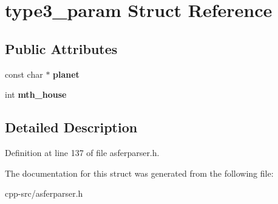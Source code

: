 \hypertarget{structtype3__param}{\section{type3\-\_\-param Struct Reference}
\label{structtype3__param}
}
\subsection*{Public Attributes}
\begin{DoxyCompactItemize}
\item 
\hypertarget{structtype3__param_a56d2c2c658ab50a4ab415f4fc7094ee0}{const char $\ast$ {\bfseries planet}}\label{structtype3__param_a56d2c2c658ab50a4ab415f4fc7094ee0}

\item 
\hypertarget{structtype3__param_aa3f096cf398cc4ecf777d217f1b06ec3}{int {\bfseries mth\-\_\-house}}\label{structtype3__param_aa3f096cf398cc4ecf777d217f1b06ec3}

\end{DoxyCompactItemize}


\subsection{Detailed Description}


Definition at line 137 of file asferparser.\-h.



The documentation for this struct was generated from the following file\-:\begin{DoxyCompactItemize}
\item 
cpp-\/src/asferparser.\-h\end{DoxyCompactItemize}
